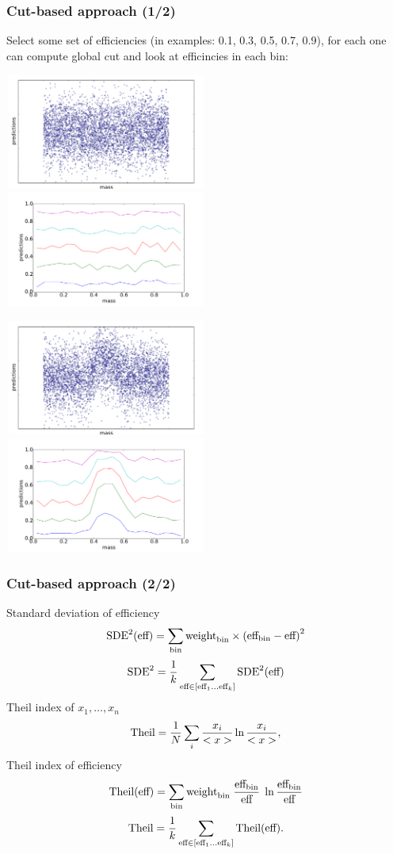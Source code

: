 \documentclass{beamer}
\begin{document}
\begin{frame}
    \frametitle{Cut-based approach (1/2)}
    Select some set of efficiencies (in examples: 0.1, 0.3, 0.5, 0.7, 0.9), 
    for each one can compute global cut and look at efficincies in each bin:

    \includegraphics[width=0.5\textwidth, height=3.8cm]{img/uniform.pdf}
    \includegraphics[width=0.5\textwidth, height=3.8cm]{img/uniform_effs.pdf}

    \includegraphics[width=0.5\textwidth, height=3.8cm]{img/nonuniform.pdf}
    \includegraphics[width=0.5\textwidth, height=3.8cm]{img/nonuniform_effs.pdf}

\end{frame}


\begin{frame}
    \frametitle{Cut-based approach (2/2)}
    Standard deviation of efficiency
    \[
    \text{SDE}^2(\text{eff}) = 
        \sum_{\text{bin}} \text{weight}_\text{bin} \times \left(\text{eff}_\text{bin} - \text{eff} \right)^2 
    \]
    \[
    \text{SDE}^2  =  \frac{1}{k} 
    \sum_{\text{eff} \in [\text{eff}_1 \dots \text{eff}_k] }  
        \text{SDE}^2(\text{eff})
    \] 
    Theil index of $x_1, \dots, x_n$
    \[
        \text{Theil} = \frac{1}{N} \sum_i \frac{x_i}{<x>} \ln{\frac{x_i}{<x>}}, 
    \]
    Theil index of efficiency
    \[
    \text{Theil}(\text{eff}) = \sum_{\text{bin}} \text{weight}_\text{bin} \; \frac{\text{eff}_\text{bin}}{\text{eff}} \; \ln{\frac{\text{eff}_\text{bin}}{\text{eff}}}
    \]
    \[
    \text{Theil}  =  \frac{1}{k} 
    \sum_{\text{eff} \in [\text{eff}_1 \dots \text{eff}_k] }  
        \text{Theil}(\text{eff}).
    \]
\end{frame}
\end{document}
